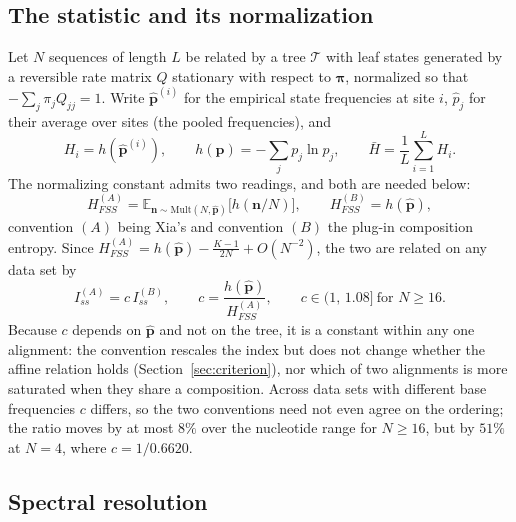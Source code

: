 \documentclass[preprint,12pt,authoryear]{elsarticle}
\newcommand{\Iss}{I_{ss}}
\newcommand{\Hbar}{\bar H}
\newcommand{\HFSS}{H_{FSS}}
\newcommand{\bpi}{\boldsymbol{\pi}}
\newcommand{\E}{\mathbb{E}}
\newcommand{\Mult}{\mathrm{Mult}}
\theoremstyle{definition}
\theoremstyle{remark}
\begin{document}
\subsection{The statistic and its normalization}
\label{sec:setting}

Let $N$ sequences of length $L$ be related by a tree $\mathcal{T}$ with leaf
states generated by a reversible rate matrix $Q$ stationary with respect to
$\bpi$, normalized so that $-\sum_j\pi_jQ_{jj}=1$. Write
$\hat{\mathbf p}^{(i)}$ for the empirical state frequencies at site $i$,
$\hat p_j$ for their average over sites (the pooled frequencies), and
\begin{equation}
  H_i=h(\hat{\mathbf p}^{(i)}),\qquad h(\mathbf p)=-\sum_j p_j\ln p_j,\qquad
  \Hbar=\frac1L\sum_{i=1}^{L}H_i .
\end{equation}
The normalizing constant admits two readings, and both are needed below:
\begin{equation}
  \HFSS^{(A)}=\E_{\mathbf n\sim\Mult(N,\hat{\mathbf p})}\bigl[h(\mathbf n/N)\bigr],
  \qquad \HFSS^{(B)}=h(\hat{\mathbf p}),
  \label{eq:conventions}
\end{equation}
convention $(A)$ being Xia's \citep{xia2003iss,xia2009handbook} and convention
$(B)$ the plug-in composition entropy. Since
$\HFSS^{(A)}=h(\hat{\mathbf p})-\frac{K-1}{2N}+O(N^{-2})$, the two are related
on any data set by
\begin{equation}
  \Iss^{(A)}=c\,\Iss^{(B)},\qquad
  c=\frac{h(\hat{\mathbf p})}{\HFSS^{(A)}},\qquad c\in(1,\,1.08]\ \text{for }N\ge16 .
  \label{eq:convention}
\end{equation}
Because $c$ depends on $\hat{\mathbf p}$ and not on the tree, it is a constant
within any one alignment: the convention rescales the index but does not
change whether the affine relation holds
(Section~\ref{sec:criterion}), nor which of two alignments is more saturated
when they share a composition. Across data sets with different base
frequencies $c$ differs, so the two conventions need not even agree on the
ordering; the ratio moves by at most $8\%$ over the nucleotide range for
$N\ge16$, but by $51\%$ at $N=4$, where $c=1/0.6620$.

\subsection{Spectral resolution}
\end{document}
